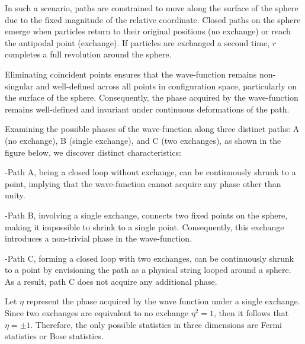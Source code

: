 \documentclass[12pt]{report}
\begin{document}
	\begin{minipage}{1 \textwidth}
		
		In such a scenario, paths are constrained to move along the surface of the sphere due to the fixed magnitude of the relative coordinate. Closed paths on the sphere emerge when particles return to their original positions (no exchange) or reach the antipodal point (exchange). If particles are exchanged a second time, $r$ completes a full revolution around the sphere. \newline
		
		Eliminating coincident points ensures that the wave-function remains non-singular and well-defined across all points in configuration space, particularly on the surface of the sphere. Consequently, the phase acquired by the wave-function remains well-defined and invariant under continuous deformations of the path.\newline
		
		Examining the possible phases of the wave-function along three distinct paths: A (no exchange), B (single exchange), and C (two exchanges), as shown in the figure below, we discover distinct characteristics: \newline
		
		-Path A, being a closed loop without exchange, can be continuously shrunk to a point, implying that the wave-function cannot acquire any phase other than unity.\newline 
		
		-Path B, involving a single exchange, connects two fixed points on the sphere, making it impossible to shrink to a single point. Consequently, this exchange introduces a non-trivial phase in the wave-function. \newline
		
		-Path C, forming a closed loop with two exchanges, can be continuously shrunk to a point by envisioning the path as a physical string looped around a sphere. As a result, path C does not acquire any additional phase.\newline
		
		Let $\eta$ represent the phase acquired by the wave function under a single exchange. Since two exchanges are equivalent to no exchange $\eta^2=1$, then it follows that $\eta = \pm 1 $. Therefore, the only possible statistics in three dimensions are Fermi statistics or Bose statistics.\newline
		

\end{minipage}
\end{document}
